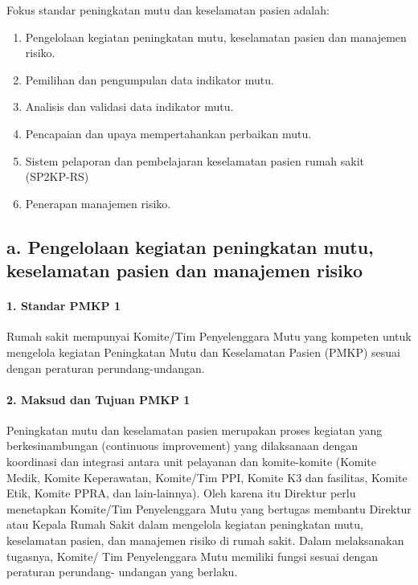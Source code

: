\documentclass[
]{book}
\providecommand{\tightlist}{%
  \setlength{\itemsep}{0pt}\setlength{\parskip}{0pt}}
\begin{document}
Fokus standar peningkatan mutu dan keselamatan pasien adalah:

\begin{enumerate}
\def\labelenumi{\alph{enumi}.}
\tightlist
\item
  Pengelolaan kegiatan peningkatan mutu, keselamatan pasien dan manajemen risiko.
\item
  Pemilihan dan pengumpulan data indikator mutu.
\item
  Analisis dan validasi data indikator mutu.
\item
  Pencapaian dan upaya mempertahankan perbaikan mutu.
\item
  Sistem pelaporan dan pembelajaran keselamatan pasien rumah sakit (SP2KP-RS)
\item
  Penerapan manajemen risiko.
\end{enumerate}

\hypertarget{a.-pengelolaan-kegiatan-peningkatan-mutu-keselamatan-pasien-dan-manajemen-risiko}{%
\subsection*{a. Pengelolaan kegiatan peningkatan mutu, keselamatan pasien dan manajemen risiko}\label{a.-pengelolaan-kegiatan-peningkatan-mutu-keselamatan-pasien-dan-manajemen-risiko}}

\hypertarget{standar-pmkp-1}{%
\paragraph*{1. Standar PMKP 1}\label{standar-pmkp-1}}

Rumah sakit mempunyai Komite/Tim Penyelenggara Mutu yang kompeten untuk mengelola kegiatan Peningkatan Mutu dan Keselamatan Pasien (PMKP) sesuai dengan peraturan perundang-undangan.

\hypertarget{maksud-dan-tujuan-pmkp-1}{%
\paragraph*{2. Maksud dan Tujuan PMKP 1}\label{maksud-dan-tujuan-pmkp-1}}

Peningkatan mutu dan keselamatan pasien merupakan proses kegiatan yang berkesinambungan (continuous improvement) yang dilaksanaan dengan koordinasi dan integrasi antara unit pelayanan dan komite-komite (Komite Medik, Komite Keperawatan, Komite/Tim PPI, Komite K3 dan fasilitas, Komite Etik, Komite PPRA, dan lain-lainnya). Oleh karena itu Direktur perlu menetapkan Komite/Tim Penyelenggara Mutu yang bertugas membantu Direktur atau Kepala Rumah Sakit dalam mengelola kegiatan peningkatan mutu, keselamatan pasien, dan manajemen risiko di rumah sakit.
Dalam melaksanakan tugasnya, Komite/ Tim Penyelenggara Mutu memiliki fungsi sesuai dengan peraturan perundang- undangan yang berlaku.
\end{document}
